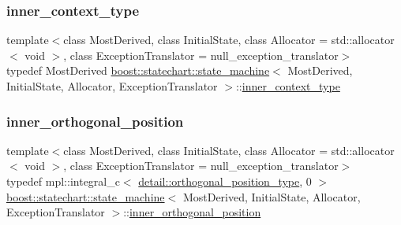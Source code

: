 \subsubsection{\texorpdfstring{inner\+\_\+context\+\_\+type}{inner\_context\_type}}
{\footnotesize\ttfamily template$<$class Most\+Derived, class Initial\+State, class Allocator = std\+::allocator$<$ void $>$, class Exception\+Translator = null\+\_\+exception\+\_\+translator$>$ \\
typedef Most\+Derived \mbox{\hyperlink{classboost_1_1statechart_1_1state__machine}{boost\+::statechart\+::state\+\_\+machine}}$<$ Most\+Derived, Initial\+State, Allocator, Exception\+Translator $>$\+::\mbox{\hyperlink{classboost_1_1statechart_1_1state__machine_ae051793d49b601dad268a2d1c35c613f}{inner\+\_\+context\+\_\+type}}}

\mbox{\label{classboost_1_1statechart_1_1state__machine_afaec7011d17371269ebbe87e25273d0b}} 
\subsubsection{\texorpdfstring{inner\+\_\+orthogonal\+\_\+position}{inner\_orthogonal\_position}}
{\footnotesize\ttfamily template$<$class Most\+Derived, class Initial\+State, class Allocator = std\+::allocator$<$ void $>$, class Exception\+Translator = null\+\_\+exception\+\_\+translator$>$ \\
typedef mpl\+::integral\+\_\+c$<$ \mbox{\hyperlink{namespaceboost_1_1statechart_1_1detail_a3bedea0b807a16fa222733417183d2c9}{detail\+::orthogonal\+\_\+position\+\_\+type}}, 0 $>$ \mbox{\hyperlink{classboost_1_1statechart_1_1state__machine}{boost\+::statechart\+::state\+\_\+machine}}$<$ Most\+Derived, Initial\+State, Allocator, Exception\+Translator $>$\+::\mbox{\hyperlink{classboost_1_1statechart_1_1state__machine_afaec7011d17371269ebbe87e25273d0b}{inner\+\_\+orthogonal\+\_\+position}}}

\mbox{\label{classboost_1_1statechart_1_1state__machine_a70f60d22dbc67497b1388e72e2bf6824}} 
